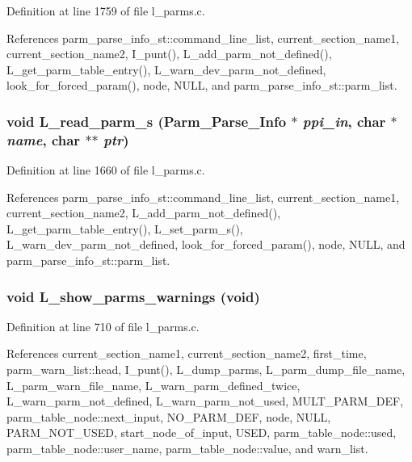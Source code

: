 Definition at line 1759 of file l\_\-parms.c.

References parm\_\-parse\_\-info\_\-st::command\_\-line\_\-list, current\_\-section\_\-name1, current\_\-section\_\-name2, I\_\-punt(), L\_\-add\_\-parm\_\-not\_\-defined(), L\_\-get\_\-parm\_\-table\_\-entry(), L\_\-warn\_\-dev\_\-parm\_\-not\_\-defined, look\_\-for\_\-forced\_\-param(), node, NULL, and parm\_\-parse\_\-info\_\-st::parm\_\-list.
\subsubsection{\setlength{\rightskip}{0pt plus 5cm}void L\_\-read\_\-parm\_\-s (\bf{Parm\_\-Parse\_\-Info} $\ast$ {\em ppi\_\-in}, char $\ast$ {\em name}, char $\ast$$\ast$ {\em ptr})}\label{l__parms_8h_17491a48ac859e9eed6815fc3ff723d9}




Definition at line 1660 of file l\_\-parms.c.

References parm\_\-parse\_\-info\_\-st::command\_\-line\_\-list, current\_\-section\_\-name1, current\_\-section\_\-name2, L\_\-add\_\-parm\_\-not\_\-defined(), L\_\-get\_\-parm\_\-table\_\-entry(), L\_\-set\_\-parm\_\-s(), L\_\-warn\_\-dev\_\-parm\_\-not\_\-defined, look\_\-for\_\-forced\_\-param(), node, NULL, and parm\_\-parse\_\-info\_\-st::parm\_\-list.
\subsubsection{\setlength{\rightskip}{0pt plus 5cm}void L\_\-show\_\-parms\_\-warnings (void)}\label{l__parms_8h_f725b05a5b630bdea7d8b719c8f50f61}




Definition at line 710 of file l\_\-parms.c.

References current\_\-section\_\-name1, current\_\-section\_\-name2, first\_\-time, parm\_\-warn\_\-list::head, I\_\-punt(), L\_\-dump\_\-parms, L\_\-parm\_\-dump\_\-file\_\-name, L\_\-parm\_\-warn\_\-file\_\-name, L\_\-warn\_\-parm\_\-defined\_\-twice, L\_\-warn\_\-parm\_\-not\_\-defined, L\_\-warn\_\-parm\_\-not\_\-used, MULT\_\-PARM\_\-DEF, parm\_\-table\_\-node::next\_\-input, NO\_\-PARM\_\-DEF, node, NULL, PARM\_\-NOT\_\-USED, start\_\-node\_\-of\_\-input, USED, parm\_\-table\_\-node::used, parm\_\-table\_\-node::user\_\-name, parm\_\-table\_\-node::value, and warn\_\-list.

